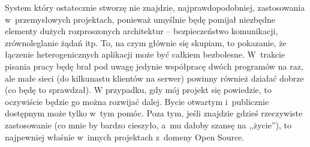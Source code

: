 System który ostatecznie stworzę nie znajdzie, najprawdopodobniej, zastosowania w~przemysłowych projektach, ponieważ umyślnie będę pomijał niezbędne elementy dużych rozproszonych architektur -- bezpieczeństwo komunikacji, zrównoleglanie żądań itp. To, na czym głównie się skupiam, to pokazanie, że łączenie heterogenicznych aplikacji może być całkiem bezbolesne. W~trakcie pisania pracy będę brał pod uwagę jedynie współpracę dwóch programów na raz, ale małe sieci (do kilkunastu klientów na serwer) powinny również działać dobrze (co będę to sprawdzał). W przypadku, gdy mój projekt się powiedzie, to oczywiście będzie go można rozwijać dalej. Bycie otwartym i~publicznie dostępnym może tylko w~tym pomóc. Poza tym, jeśli znajdzie gdzieś rzeczywiste zastosowanie (co mnie by bardzo cieszyło, a~mu dałoby szansę na ,,życie''), to najpewniej właśnie w~innych projektach z~domeny Open Source.



